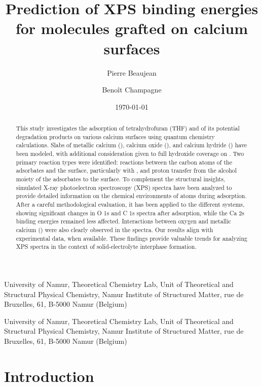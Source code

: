 \documentclass[%
aip,
amsmath,amssymb,
preprint,%
jcp,
showkeys,
]{revtex4-2}
\begin{document}
	
\title{Prediction of XPS binding energies for molecules grafted on calcium surfaces}

\author{Pierre Beaujean}
\affiliation
{University of Namur, Theoretical Chemistry Lab, Unit of Theoretical and Structural Physical Chemistry, Namur Institute of Structured Matter, rue de Bruxelles, 61, B-5000 Namur (Belgium)}


\author{Benoît Champagne}
\affiliation
{University of Namur, Theoretical Chemistry Lab, Unit of Theoretical and Structural Physical Chemistry, Namur Institute of Structured Matter, rue de Bruxelles, 61, B-5000 Namur (Belgium)}

\date{\today}

\begin{abstract} %
	This study investigates the adsorption of tetrahydrofuran (THF) and of its potential degradation products on various calcium surfaces using quantum chemistry calculations. Slabs of metallic calcium (), calcium oxide (), and calcium hydride () have been modeled, with additional consideration given to full hydroxide coverage on . Two primary reaction types were identified: reactions between the carbon atoms of the adsorbates and the surface, particularly with , and proton transfer from the alcohol moiety of the adsorbates to the  surface. To complement the structural insights, simulated X-ray photoelectron spectroscopy (XPS) spectra have been analyzed to provide detailed information on the chemical environments of atoms during adsorption. After a careful methodological evaluation, it has been applied to the different systems, showing significant changes in O 1s and C 1s spectra after adsorption, while the Ca 2s binding energies remained less affected. Interactions between oxygen and metallic calcium () were also clearly observed in the spectra. Our results align with experimental data, when available.	These findings provide valuable trends for analyzing XPS spectra in the context of solid-electrolyte interphase formation. 
\end{abstract}


\maketitle


\clearpage
\section{Introduction}
\end{document}
